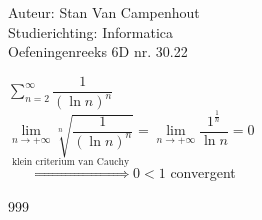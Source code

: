 \documentclass[a4paper]{article}
\begin{document}
  
\noindent \large Auteur: Stan Van Campenhout \\
\noindent \large Studierichting:  Informatica\\
\noindent \large Oefeningenreeks 6D nr. 30.22\\

\medskip

\normalsize

$ \displaystyle\sum\limits_{n = 2}^\infty \dfrac{1}{\left(\ln n\right)^n} $\\

$ \lim\limits_{n \rightarrow +\infty}\sqrt[n]{\dfrac{1}{\left(\ln n\right)^n}} = \lim\limits_{n\rightarrow+\infty}\dfrac{1^{\tfrac{1}{n}}}{\ln n} = 0 $\\

$ \stackrel{\text{klein criterium van Cauchy}}{\Rightarrow} 0 < 1 $ convergent \\

\begin{thebibliography}{999}
\end{thebibliography}
\end{document}
